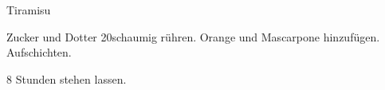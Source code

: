 \begin{recipe}{Tiramisu}

    \begin{ingredients}
    \end{ingredients}

    \begin{instructions}
        Zucker und Dotter 20\minutes schaumig rühren.
        Orange und Mascarpone hinzufügen.
        Aufschichten.

        8 Stunden stehen lassen.
    \end{instructions}
\end{recipe}
